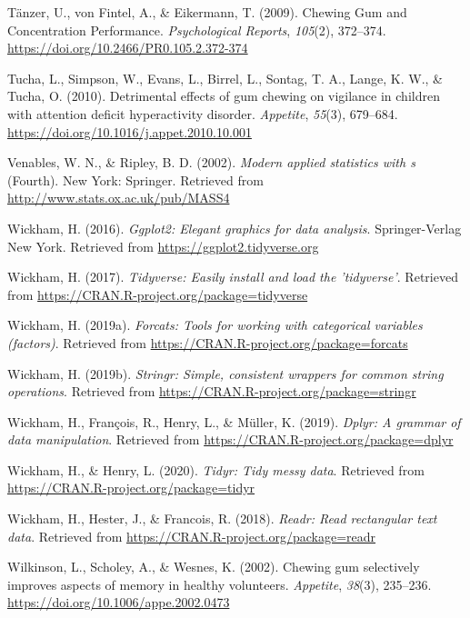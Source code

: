 \documentclass[english,jou]{apa6}
\begin{document}
\leavevmode\hypertarget{ref-tanzerChewingGumConcentration2009}{}%
Tänzer, U., von Fintel, A., \& Eikermann, T. (2009). Chewing Gum and Concentration Performance. \emph{Psychological Reports}, \emph{105}(2), 372--374. \url{https://doi.org/10.2466/PR0.105.2.372-374}

\leavevmode\hypertarget{ref-tuchaDetrimentalEffectsGum2010}{}%
Tucha, L., Simpson, W., Evans, L., Birrel, L., Sontag, T. A., Lange, K. W., \& Tucha, O. (2010). Detrimental effects of gum chewing on vigilance in children with attention deficit hyperactivity disorder. \emph{Appetite}, \emph{55}(3), 679--684. \url{https://doi.org/10.1016/j.appet.2010.10.001}

\leavevmode\hypertarget{ref-R-MASS}{}%
Venables, W. N., \& Ripley, B. D. (2002). \emph{Modern applied statistics with s} (Fourth). New York: Springer. Retrieved from \url{http://www.stats.ox.ac.uk/pub/MASS4}

\leavevmode\hypertarget{ref-R-ggplot2}{}%
Wickham, H. (2016). \emph{Ggplot2: Elegant graphics for data analysis}. Springer-Verlag New York. Retrieved from \url{https://ggplot2.tidyverse.org}

\leavevmode\hypertarget{ref-R-tidyverse}{}%
Wickham, H. (2017). \emph{Tidyverse: Easily install and load the 'tidyverse'}. Retrieved from \url{https://CRAN.R-project.org/package=tidyverse}

\leavevmode\hypertarget{ref-R-forcats}{}%
Wickham, H. (2019a). \emph{Forcats: Tools for working with categorical variables (factors)}. Retrieved from \url{https://CRAN.R-project.org/package=forcats}

\leavevmode\hypertarget{ref-R-stringr}{}%
Wickham, H. (2019b). \emph{Stringr: Simple, consistent wrappers for common string operations}. Retrieved from \url{https://CRAN.R-project.org/package=stringr}

\leavevmode\hypertarget{ref-R-dplyr}{}%
Wickham, H., François, R., Henry, L., \& Müller, K. (2019). \emph{Dplyr: A grammar of data manipulation}. Retrieved from \url{https://CRAN.R-project.org/package=dplyr}

\leavevmode\hypertarget{ref-R-tidyr}{}%
Wickham, H., \& Henry, L. (2020). \emph{Tidyr: Tidy messy data}. Retrieved from \url{https://CRAN.R-project.org/package=tidyr}

\leavevmode\hypertarget{ref-R-readr}{}%
Wickham, H., Hester, J., \& Francois, R. (2018). \emph{Readr: Read rectangular text data}. Retrieved from \url{https://CRAN.R-project.org/package=readr}

\leavevmode\hypertarget{ref-wilkinsonChewingGumSelectively2002}{}%
Wilkinson, L., Scholey, A., \& Wesnes, K. (2002). Chewing gum selectively improves aspects of memory in healthy volunteers. \emph{Appetite}, \emph{38}(3), 235--236. \url{https://doi.org/10.1006/appe.2002.0473}

\endgroup
\end{document}
